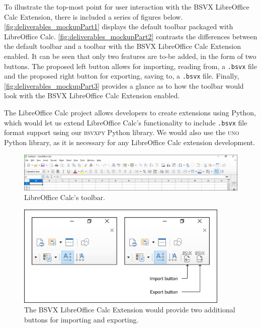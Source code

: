 \documentclass[10pt]{article}
\begin{document}
\indent{}
To illustrate the top-most point for user interaction with the BSVX LibreOffice Calc Extension, there is included a series of figures below. 
\autoref{fig:deliverables_mockupPart1} displays the default toolbar packaged with LibreOffice Calc.
\autoref{fig:deliverables_mockupPart2} contrasts the differences between the default toolbar and a toolbar with the BSVX LibreOffice Calc Extension enabled.
It can be seen that only two features are to-be added, in the form of two buttons.
The proposed left button allows for importing, reading from, a \texttt{.bsvx} file and the proposed right button for exporting, saving to, a \texttt{.bsvx} file.
Finally, \autoref{fig:deliverables_mockupPart3} provides a glance as to how the toolbar would look with the BSVX LibreOffice Calc Extension enabled.

\indent{}
The LibreOffice Calc project allows developers to create extensions using Python, which would let us extend LibreOffice Calc’s functionality to include \texttt{.bsvx} file format support using our \textsc{bsvxpy} Python library.
We would also use the \textsc{uno} Python library, as it is necessary for any LibreOffice Calc extension development.

\begin{figure}[H]
\centering
\includegraphics[width=\textwidth]{figures/mockupPart1.png}
\caption{LibreOffice Calc's toolbar.}
\label{fig:deliverables_mockupPart1}
\end{figure}

\begin{figure}[H]
\centering
\includegraphics[width=4in]{figures/mockupPart2.png}
\caption{The BSVX LibreOffice Calc Extension would provide two additional buttons for importing and exporting.}
\label{fig:deliverables_mockupPart2}
\end{figure}
\end{document}
